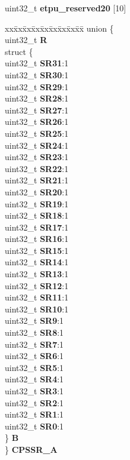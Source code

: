 \begin{DoxyCompactItemize}
\begin{tabbing}
\end{tabbing}\item 
\mbox{\label{structETPU__tag_a6e88900c88817a6b0c8070d4f32b99dc}} 
uint32\+\_\+t {\bfseries etpu\+\_\+reserved20} \mbox{[}10\mbox{]}
\item 
\mbox{\label{structETPU__tag_a734a842de0a8f51ad29f23a6e29ab013}} 
\begin{tabbing}
xx\=xx\=xx\=xx\=xx\=xx\=xx\=xx\=xx\=\kill
union \{\\
\>uint32\_t {\bfseries R}\\
\>struct \{\\
\>\>uint32\_t {\bfseries SR31}:1\\
\>\>uint32\_t {\bfseries SR30}:1\\
\>\>uint32\_t {\bfseries SR29}:1\\
\>\>uint32\_t {\bfseries SR28}:1\\
\>\>uint32\_t {\bfseries SR27}:1\\
\>\>uint32\_t {\bfseries SR26}:1\\
\>\>uint32\_t {\bfseries SR25}:1\\
\>\>uint32\_t {\bfseries SR24}:1\\
\>\>uint32\_t {\bfseries SR23}:1\\
\>\>uint32\_t {\bfseries SR22}:1\\
\>\>uint32\_t {\bfseries SR21}:1\\
\>\>uint32\_t {\bfseries SR20}:1\\
\>\>uint32\_t {\bfseries SR19}:1\\
\>\>uint32\_t {\bfseries SR18}:1\\
\>\>uint32\_t {\bfseries SR17}:1\\
\>\>uint32\_t {\bfseries SR16}:1\\
\>\>uint32\_t {\bfseries SR15}:1\\
\>\>uint32\_t {\bfseries SR14}:1\\
\>\>uint32\_t {\bfseries SR13}:1\\
\>\>uint32\_t {\bfseries SR12}:1\\
\>\>uint32\_t {\bfseries SR11}:1\\
\>\>uint32\_t {\bfseries SR10}:1\\
\>\>uint32\_t {\bfseries SR9}:1\\
\>\>uint32\_t {\bfseries SR8}:1\\
\>\>uint32\_t {\bfseries SR7}:1\\
\>\>uint32\_t {\bfseries SR6}:1\\
\>\>uint32\_t {\bfseries SR5}:1\\
\>\>uint32\_t {\bfseries SR4}:1\\
\>\>uint32\_t {\bfseries SR3}:1\\
\>\>uint32\_t {\bfseries SR2}:1\\
\>\>uint32\_t {\bfseries SR1}:1\\
\>\>uint32\_t {\bfseries SR0}:1\\
\>\} {\bfseries B}\\
\} {\bfseries CPSSR\_A}\\


\end{tabbing}
\end{DoxyCompactItemize}
